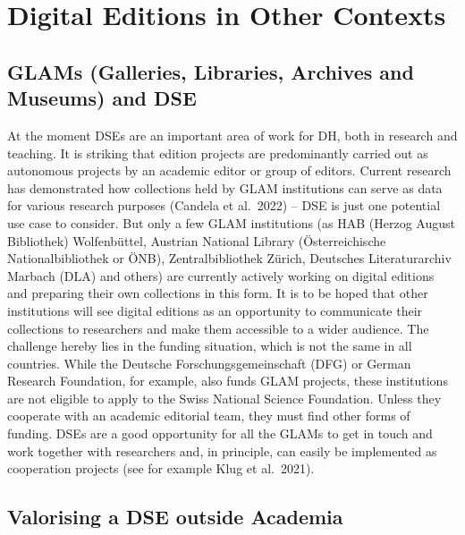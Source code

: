 \documentclass[
  letterpaper,
  DIV=11,
  numbers=noendperiod]{scrreprt}
\begin{document}
\section{Digital Editions in Other
Contexts}\label{digital-editions-in-other-contexts}

\subsection{GLAMs (Galleries, Libraries, Archives and Museums) and
DSE}\label{glams-galleries-libraries-archives-and-museums-and-dse}

At the moment DSEs are an important area of work for DH, both in
research and teaching. It is striking that edition projects are
predominantly carried out as autonomous projects by an academic editor
or group of editors. Current research has demonstrated how collections
held by GLAM institutions can serve as data for various research
purposes (Candela et al.~2022) -- DSE is just one potential use case to
consider. But only a few GLAM institutions (as HAB (Herzog August
Bibliothek) Wolfenbüttel, Austrian National Library (Österreichische
Nationalbibliothek or ÖNB), Zentralbibliothek Zürich, Deutsches
Literaturarchiv Marbach (DLA) and others) are currently actively working
on digital editions and preparing their own collections in this form. It
is to be hoped that other institutions will see digital editions as an
opportunity to communicate their collections to researchers and make
them accessible to a wider audience. The challenge hereby lies in the
funding situation, which is not the same in all countries. While the
Deutsche Forschungsgemeinschaft (DFG) or German Research Foundation, for
example, also funds GLAM projects, these institutions are not eligible
to apply to the Swiss National Science Foundation. Unless they cooperate
with an academic editorial team, they must find other forms of funding.
DSEs are a good opportunity for all the GLAMs to get in touch and work
together with researchers and, in principle, can easily be implemented
as cooperation projects (see for example Klug et al.~2021).

\subsection{Valorising a DSE outside
Academia}\label{valorising-a-dse-outside-academia}
\end{document}
